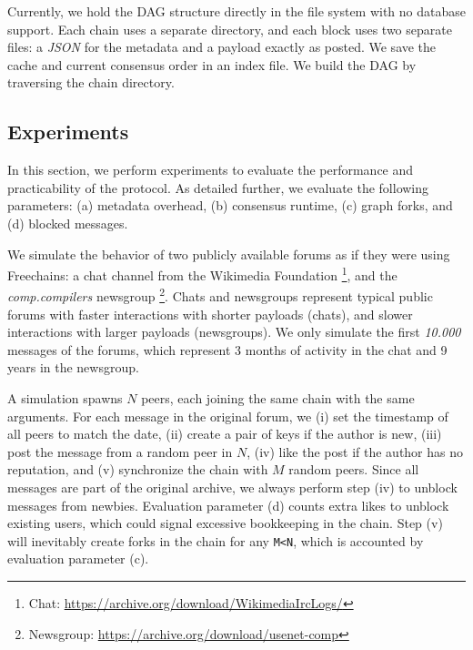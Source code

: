 \documentclass[12pt]{article}
\newcommand{\FC}       {Freechains\xspace}
\begin{document}
Currently, we hold the DAG structure directly in the file system with no
database support.
Each chain uses a separate directory, and each block uses two separate files:
a \emph{JSON} for the metadata and a payload exactly as posted.
We save the cache and current consensus order in an index file.
We build the DAG by traversing the chain directory.

\subsection{Experiments}
\label{sec.consensus.eval}

In this section, we perform experiments to evaluate the performance and
practicability of the protocol.
%
As detailed further, we evaluate the following parameters:
    (a) metadata overhead,
    (b) consensus runtime,
    (c) graph forks, and
    (d) blocked messages.

We simulate the behavior of two publicly available forums as if they were using
\FC:
%
    a chat channel from the Wikimedia Foundation%
\footnote{ Chat: \url{https://archive.org/download/WikimediaIrcLogs/} }, and
    the \emph{comp.compilers} newsgroup%
\footnote{ Newsgroup: \url{https://archive.org/download/usenet-comp} }.
%
Chats and newsgroups represent typical public forums with
    faster interactions with shorter payloads (chats), and
    slower interactions with larger payloads (newsgroups).
%
We only simulate the first \emph{10.000} messages of the forums, which
represent 3 months of activity in the chat and 9 years in the newsgroup.

A simulation spawns $N$ peers, each joining the same chain with the same
arguments.
For each message in the original forum, we
    (i)   set the timestamp of all peers to match the date,
    (ii)  create a pair of keys if the author is new,
    (iii) post the message from a random peer in $N$,
    (iv)  like the post if the author has no reputation, and
    (v)   synchronize the chain with $M$ random peers.
%
Since all messages are part of the original archive, we always perform step
(iv) to unblock messages from newbies.
Evaluation parameter (d) counts extra likes to unblock existing users, which
could signal excessive bookkeeping in the chain.
Step (v) will inevitably create forks in the chain for any \texttt{M<N}, which
is accounted by evaluation parameter (c).
\end{document}
